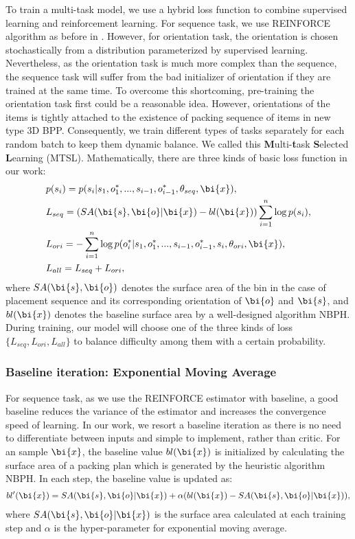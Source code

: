 To train a multi-task model, we use a hybrid loss function to combine supervised learning and reinforcement learning.
For sequence task, we use REINFORCE algorithm \cite{williams1992simple} as before in \cite{Hu2017Solving}. However, for orientation task, the orientation is chosen stochastically from a distribution parameterized by supervised learning. Nevertheless, as the orientation task is much more complex than the sequence, the sequence task will suffer from the bad initializer of orientation if they are trained at the same time. To overcome this shortcoming, pre-training the orientation task first could be a reasonable idea.
However, orientations of the items is tightly attached to the existence of packing sequence of items in new type 3D BPP. 
Consequently, we train different types of tasks separately for each random batch to keep them dynamic balance.
We called this \textbf{M}ulti-\textbf{t}ask \textbf{S}elected \textbf{L}earning (MTSL). Mathematically, there are three kinds of basic loss function in our work:
\begin{eqnarray*}
	&p(s_{i}) = {p(s_{i}|s_{1},o_{1}^{*}, ..., s_{i-1}, o_{i-1}^{*}, \theta_{seq}, \bi{x})},\\
	&L_{seq} = (SA(\bi{s},\bi{o}|\bi{x}) - bl(\bi{x}))\sum\limits_{i=1}^{n}\log{p(s_{i})},\\
	& L_{ori} = -\sum\limits_{i=1}^{n}\log{p(o_{i}^{*}|s_{1}, o_{1}^{*}, ..., s_{i-1}, o_{i-1}^{*}, s_{i}, \theta_{ori}, \bi{x})},\\
	&L_{all} = L_{seq} + L_{ori},
\end{eqnarray*}
where $SA(\bi{s},\bi{o})$ denotes the surface area of the bin in the case of 
placement sequence and its corresponding orientation of $\bi{o}$ and $\bi{s}$, 
and $bl(\bi{x})$ denotes the baseline surface area by a well-designed algorithm NBPH.  %
During training, our model will choose one of the three kinds of loss $\{L_{seq}, L_{ori}, L_{all}\}$
to balance difficulty among them with a certain probability.  

\subsubsection{Baseline iteration: Exponential Moving Average}
For sequence task, as we use the REINFORCE estimator with baseline, a good baseline reduces the variance of the estimator and increases the convergence speed of learning. In our work, we resort a baseline iteration as there is no need to differentiate between inputs and simple to implement, rather than critic. For an sample $\bi{x}$, the baseline value $bl(\bi{x})$ is initialized by calculating the surface area of a packing plan which is generated by the heuristic algorithm NBPH. In each step, the baseline value is updated as:
\begin{eqnarray*}
	bl'(\bi{x}) = SA(\bi{s},\bi{o}|\bi{x}) + \alpha(bl(\bi{x})-SA(\bi{s},\bi{o}|\bi{x})),
\end{eqnarray*}
where $SA(\bi{s},\bi{o}|\bi{x})$ is the surface area calculated at each training step and $\alpha$ is the hyper-parameter for exponential moving average.

